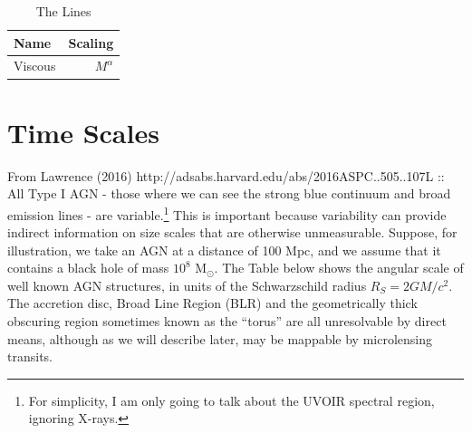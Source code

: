 \documentclass[11pt]{article}
\begin{document}
\begin{table}
  \caption{The Lines}
  \label{tab:the_lines}
  \begin{center}
    \begin{tabular}{lr} 
      \hline
      \hline
      Name & Scaling \\ 
      \hline
      Viscous & $M^{\alpha}$ \\
     \hline
      \hline
   \end{tabular}
  \end{center}
\end{table}




\newpage
\section{Time Scales}
From Lawrence (2016) http://adsabs.harvard.edu/abs/2016ASPC..505..107L :: \\
All Type I AGN - those where we can see the strong blue continuum and
broad emission lines - are variable.\footnote{For simplicity, I am
only going to talk about the UVOIR spectral region, ignoring X-rays.}
This is important because variability can provide indirect information
on size scales that are otherwise unmeasurable. Suppose, for
illustration, we take an AGN at a distance of 100 Mpc, and we assume
that it contains a black hole of mass $10^8$ M$_\odot$. The Table
below shows the angular scale of well known AGN structures, in units
of the Schwarzschild radius $R_S=2GM/c^2$. The accretion disc, Broad
Line Region (BLR) and the geometrically thick obscuring region
sometimes known as the ``torus'' are all unresolvable by direct means,
although as we will describe later, may be mappable by microlensing
transits.
\end{document}
